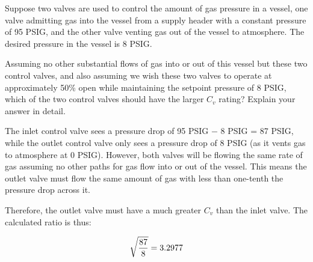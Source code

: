 

Suppose two valves are used to control the amount of gas pressure in a vessel, one valve admitting gas into the vessel from a supply header with a constant pressure of 95 PSIG, and the other valve venting gas out of the vessel to atmosphere.  The desired pressure in the vessel is 8 PSIG.

\vskip 10pt

Assuming no other substantial flows of gas into or out of this vessel but these two control valves, and also assuming we wish these two valves to operate at approximately 50\% open while maintaining the setpoint pressure of 8 PSIG, which of the two control valves should have the larger $C_v$ rating?  Explain your answer in detail.







The inlet control valve sees a pressure drop of 95 PSIG $-$ 8 PSIG = 87 PSIG, while the outlet control valve only sees a pressure drop of 8 PSIG (as it vents gas to atmosphere at 0 PSIG).  However, both valves will be flowing the same rate of gas assuming no other paths for gas flow into or out of the vessel.  This means the outlet valve must flow the same amount of gas with less than one-tenth the pressure drop across it.  

\vskip 10pt

Therefore, the outlet valve must have a much greater $C_v$ than the inlet valve.  The calculated ratio is thus:

$$\sqrt{87 \over 8} = 3.2977$$











